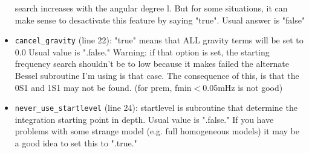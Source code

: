 \documentclass[11pt]{article}
\begin{document}
\begin{itemize}
search increases with the  angular degree l.  But for some situations, it can make sense
             to desactivate this feature by saying "true". Usual answer 
             is "false"
\item {\tt cancel\_gravity} (line 22): "true" means that ALL gravity terms will be set to 0.0
             Usual value is ".false."
       Warning: if that option is set, the starting frequency search
       shouldn't be to low because it makes failed the alternate
       Bessel subroutine  I'm using is that case. 
       The consequence of this, is that the 0S1 and 1S1 may not be 
       found. (for prem, fmin$<$0.05mHz is not good)
\item {\tt never\_use\_startlevel} (line 24): startlevel is subroutine that determine the integration 
             starting point in depth. 
             Usual value is ".false."
             If you have problems with some strange model (e.g. full homogeneous models)
             it may be a good idea to set this to ".true."
                

\end{itemize}
\end{document}
